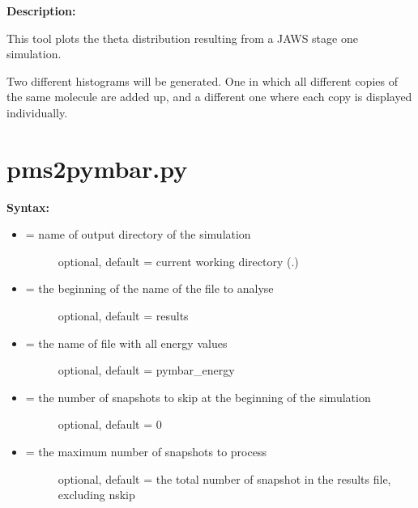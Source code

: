 \documentclass[letterpaper,10pt,english]{manual}
\begin{document}
\textbf{Description:}

This tool plots the theta distribution resulting from a JAWS stage one simulation.

Two different histograms will be generated. One in which all different copies of the same molecule are added up, and a different one where each copy is displayed individually.


\section{pms2pymbar.py}

\textbf{Syntax:}

\begin{itemize}
\item {} \begin{description}
\item[{ = name of output directory of the simulation}] \leavevmode
optional, default = current working directory (.)

\end{description}

\item {} \begin{description}
\item[{ = the beginning of the name of the file to analyse}] \leavevmode
optional, default = results

\end{description}

\item {} \begin{description}
\item[{ = the name of file with all energy values}] \leavevmode
optional, default = pymbar\_energy

\end{description}

\item {} \begin{description}
\item[{ = the number of snapshots to skip at the beginning of the simulation}] \leavevmode
optional, default = 0

\end{description}

\item {} \begin{description}
\item[{ = the maximum number of snapshots to process}] \leavevmode
optional, default = the total number of snapshot in the results file, excluding nskip


\end{description}
\end{itemize}
\end{document}
